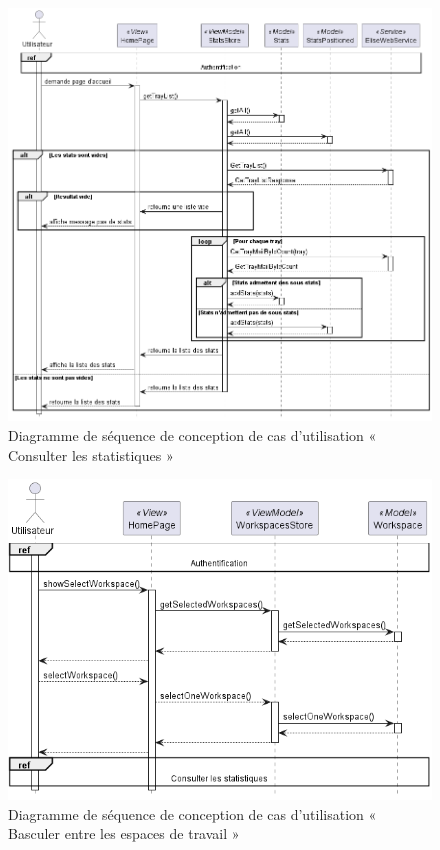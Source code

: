 \begin{figure}[H]
  \centering
  \includegraphics[width=1\textwidth]{out/diagrams/sprint7/sequence_view_stats/sequence_view_stats}
  \caption{Diagramme de séquence de conception de cas d'utilisation « Consulter les statistiques »}
  \label{fig:sequence_conception_consulter_statistiques}
\end{figure}

\begin{figure}[H]
  \centering
  \includegraphics[width=1\textwidth]{out/diagrams/sprint7/sequence_switch_workspace/sequence_switch_workspace}
  \caption{Diagramme de séquence de conception de cas d'utilisation « Basculer entre les espaces de travail »}
  \label{fig:sequence_conception_sequence_switch_workspace}
\end{figure}


